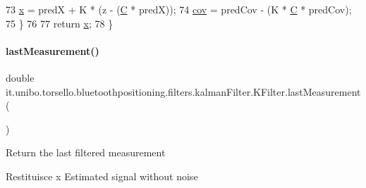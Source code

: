 \begin{DoxyCode}
73             \hyperlink{classit_1_1unibo_1_1torsello_1_1bluetoothpositioning_1_1filters_1_1kalmanFilter_1_1KFilter_ad07c13a7c5d92b40ff76743a8734014b_ad07c13a7c5d92b40ff76743a8734014b}{x} = predX + K * (z - (\hyperlink{classit_1_1unibo_1_1torsello_1_1bluetoothpositioning_1_1filters_1_1kalmanFilter_1_1KFilter_a67a040dd80123bdb5393070b299fc2bf_a67a040dd80123bdb5393070b299fc2bf}{C} * predX));
74             \hyperlink{classit_1_1unibo_1_1torsello_1_1bluetoothpositioning_1_1filters_1_1kalmanFilter_1_1KFilter_a0a5121231c91117dddcdd9aa11e6be3a_a0a5121231c91117dddcdd9aa11e6be3a}{cov} = predCov - (K * \hyperlink{classit_1_1unibo_1_1torsello_1_1bluetoothpositioning_1_1filters_1_1kalmanFilter_1_1KFilter_a67a040dd80123bdb5393070b299fc2bf_a67a040dd80123bdb5393070b299fc2bf}{C} * predCov);
75         \}
76 
77         \textcolor{keywordflow}{return} \hyperlink{classit_1_1unibo_1_1torsello_1_1bluetoothpositioning_1_1filters_1_1kalmanFilter_1_1KFilter_ad07c13a7c5d92b40ff76743a8734014b_ad07c13a7c5d92b40ff76743a8734014b}{x};
78     \}
\end{DoxyCode}
\hypertarget{classit_1_1unibo_1_1torsello_1_1bluetoothpositioning_1_1filters_1_1kalmanFilter_1_1KFilter_a5a1ade84907daef31371ef332e4243da_a5a1ade84907daef31371ef332e4243da}{}\label{classit_1_1unibo_1_1torsello_1_1bluetoothpositioning_1_1filters_1_1kalmanFilter_1_1KFilter_a5a1ade84907daef31371ef332e4243da_a5a1ade84907daef31371ef332e4243da} 
\paragraph{\texorpdfstring{last\+Measurement()}{lastMeasurement()}}
{\footnotesize\ttfamily double it.\+unibo.\+torsello.\+bluetoothpositioning.\+filters.\+kalman\+Filter.\+K\+Filter.\+last\+Measurement (\begin{DoxyParamCaption}{ }\end{DoxyParamCaption})\hspace{0.3cm}{\ttfamily [private]}}

Return the last filtered measurement

\begin{DoxyReturn}{Restituisce}
x Estimated signal without noise 
\end{DoxyReturn}

